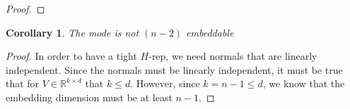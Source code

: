 \documentclass[12pt]{article}
\newcommand{\reals}{\mathbb{R}}
\newcommand{\inprod}[2]{\langle #1, #2 \rangle}
\newtheorem{corollary}{Corollary}
\begin{document}
\begin{proof}
  
  
%  	
  
\end{proof}

\begin{corollary}
  The mode is not $(n-2)$ embeddable
\end{corollary}
\begin{proof}
  In order to have a tight $H$-rep, we need normals that are linearly independent.
  Since the normals must be linearly independent, it must be true that for $V \in \reals^{k \times d}$ that $k \leq d$.
  However, since $k = n-1 \leq d$, we know that the embedding dimension must be at least $n-1$.
\end{proof}
\end{document}
